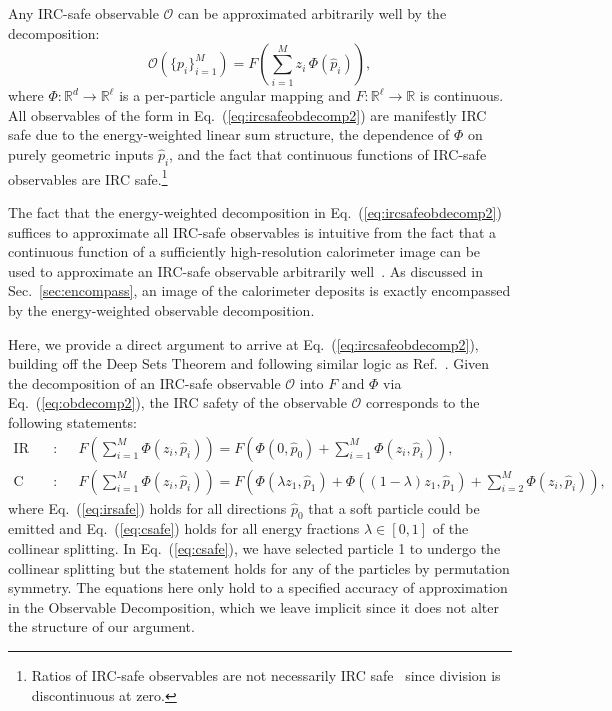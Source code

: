 \documentclass[letterpaper,11pt]{article}
\DeclareRobustCommand{\Sec}[1]{Sec.~\ref{#1}}
\DeclareRobustCommand{\Eq}[1]{Eq.~(\ref{#1})}
\DeclareRobustCommand{\Ref}[1]{Ref.~\cite{#1}}
\begin{document}
Any IRC-safe observable $\mathcal O$ can be approximated arbitrarily well by the decomposition:
\begin{equation}
\label{eq:ircsafeobdecomp2}
\mathcal O\left(\{p_i\}_{i=1}^M\right) = F\left(\sum_{i=1}^M z_i\, \Phi (\hat p_i)\right),
\end{equation}
where $\Phi: \mathbb R^d \to \mathbb R^\ell$ is a per-particle angular mapping and $F:\mathbb R^\ell\to \mathbb R$ is continuous.
%
All observables of the form in \Eq{eq:ircsafeobdecomp2} are manifestly IRC safe due to the energy-weighted linear sum structure, the dependence of $\Phi$ on purely geometric inputs $\hat p_i$, and the fact that continuous functions of IRC-safe observables are IRC safe.\footnote{Ratios of IRC-safe observables are not necessarily IRC safe~\cite{Larkoski:2013paa,Larkoski:2015lea} since division is discontinuous at zero.}


The fact that the energy-weighted decomposition in \Eq{eq:ircsafeobdecomp2} suffices to approximate all IRC-safe observables is intuitive from the fact that a continuous function of a sufficiently high-resolution calorimeter image can be used to approximate an IRC-safe observable arbitrarily well~\cite{Tkachov:1995kk,Sveshnikov:1995vi,Cherzor:1997ak}.
%
As discussed in \Sec{sec:encompass}, an image of the calorimeter deposits is exactly encompassed by the energy-weighted observable decomposition.


Here, we provide a direct argument to arrive at \Eq{eq:ircsafeobdecomp2}, building off the Deep Sets Theorem and following similar logic as \Ref{Komiske:2017aww}.
%
Given the decomposition of an IRC-safe observable $\mathcal O$ into $F$ and $\Phi$ via \Eq{eq:obdecomp2}, the IRC safety of the observable $\mathcal O$ corresponds to the following statements:
\begin{align}
\text{IR safety}:&\quad F\left(\sum_{i=1}^M\Phi(z_i,\hat p_i)\right)=F\left(\Phi(0,\hat p_0)+\sum_{i=1}^M\Phi(z_i,\hat p_i)\right),\label{eq:irsafe}\\
\text{C safety}:&\quad F\left(\sum_{i=1}^M\Phi(z_i,\hat p_i)\right)=F\left(\Phi(\lambda z_1,\hat p_1)+\Phi((1-\lambda)z_1,\hat p_1)+\sum_{i=2}^M\Phi(z_i,\hat p_i)\right),\label{eq:csafe}
\end{align}
where \Eq{eq:irsafe} holds for all directions $\hat p_0$ that a soft particle could be emitted and \Eq{eq:csafe} holds for all energy fractions $\lambda\in[0,1]$ of the collinear splitting.
%
In \Eq{eq:csafe}, we have selected particle 1 to undergo the collinear splitting but the statement holds for any of the particles by permutation symmetry.
%
The equations here only hold to a specified accuracy of approximation in the Observable Decomposition, which we leave implicit since it does not alter the structure of our argument.
\end{document}
